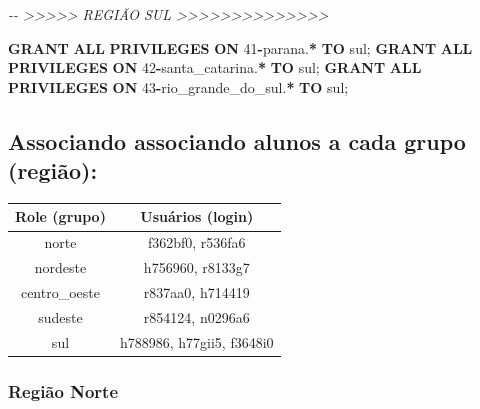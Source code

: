 \documentclass[
]{book}
\makeatletter
\newenvironment{Shaded}{\begin{snugshade}}{\end{snugshade}}
\newcommand{\CommentTok}[1]{\textcolor[rgb]{0.56,0.35,0.01}{\textit{#1}}}
\newcommand{\DecValTok}[1]{\textcolor[rgb]{0.00,0.00,0.81}{#1}}
\newcommand{\KeywordTok}[1]{\textcolor[rgb]{0.13,0.29,0.53}{\textbf{#1}}}
\newcommand{\NormalTok}[1]{#1}
\newcommand{\OperatorTok}[1]{\textcolor[rgb]{0.81,0.36,0.00}{\textbf{#1}}}
\newcommand{\StringTok}[1]{\textcolor[rgb]{0.31,0.60,0.02}{#1}}
\newcommand*\pandocbounded[1]{%
  \sbox\pandoc@box{#1}%
  \Gscale@div\@tempa{\textheight}{\dimexpr\ht\pandoc@box+\dp\pandoc@box\relax}%
  \Gscale@div\@tempb{\linewidth}{\wd\pandoc@box}%
  \ifdim\@tempb\p@<\@tempa\p@\let\@tempa\@tempb\fi%
  \ifdim\@tempa\p@<\p@\scalebox{\@tempa}{\usebox\pandoc@box}%
  \else\usebox{\pandoc@box}%
  \fi%
}
\makeatother
\begin{document}
\begin{Shaded}
\begin{Highlighting}[]
\CommentTok{{-}{-} \textgreater{}\textgreater{}\textgreater{}\textgreater{}\textgreater{} REGIÃO SUL \textgreater{}\textgreater{}\textgreater{}\textgreater{}\textgreater{}\textgreater{}\textgreater{}\textgreater{}\textgreater{}\textgreater{}\textgreater{}\textgreater{}\textgreater{}\textgreater{}}

\KeywordTok{GRANT} \KeywordTok{ALL} \KeywordTok{PRIVILEGES} \KeywordTok{ON}\NormalTok{ \textasciigrave{}}\DecValTok{41}\OperatorTok{{-}}\NormalTok{parana\textasciigrave{}.}\OperatorTok{*}            \KeywordTok{TO} \StringTok{\textquotesingle{}sul\textquotesingle{}}\NormalTok{;}
\KeywordTok{GRANT} \KeywordTok{ALL} \KeywordTok{PRIVILEGES} \KeywordTok{ON}\NormalTok{ \textasciigrave{}}\DecValTok{42}\OperatorTok{{-}}\NormalTok{santa\_catarina\textasciigrave{}.}\OperatorTok{*}    \KeywordTok{TO} \StringTok{\textquotesingle{}sul\textquotesingle{}}\NormalTok{;}
\KeywordTok{GRANT} \KeywordTok{ALL} \KeywordTok{PRIVILEGES} \KeywordTok{ON}\NormalTok{ \textasciigrave{}}\DecValTok{43}\OperatorTok{{-}}\NormalTok{rio\_grande\_do\_sul\textasciigrave{}.}\OperatorTok{*} \KeywordTok{TO} \StringTok{\textquotesingle{}sul\textquotesingle{}}\NormalTok{;}
\end{Highlighting}
\end{Shaded}

\subsection{Associando associando alunos a cada grupo (região):}\label{associando-associando-alunos-a-cada-grupo-regiuxe3o}

\begin{longtable}[]{@{}cc@{}}
\toprule\noalign{}
Role (grupo) & Usuários (login) \\
\midrule\noalign{}
\endhead
\bottomrule\noalign{}
\endlastfoot
norte & f362bf0, r536fa6 \\
nordeste & h756960, r8133g7 \\
centro\_oeste & r837aa0, h714419 \\
sudeste & r854124, n0296a6 \\
sul & h788986, h77gii5, f3648i0 \\
\end{longtable}

\subsubsection{Região Norte}\label{regiuxe3o-norte}

\pandocbounded{}
\end{document}
